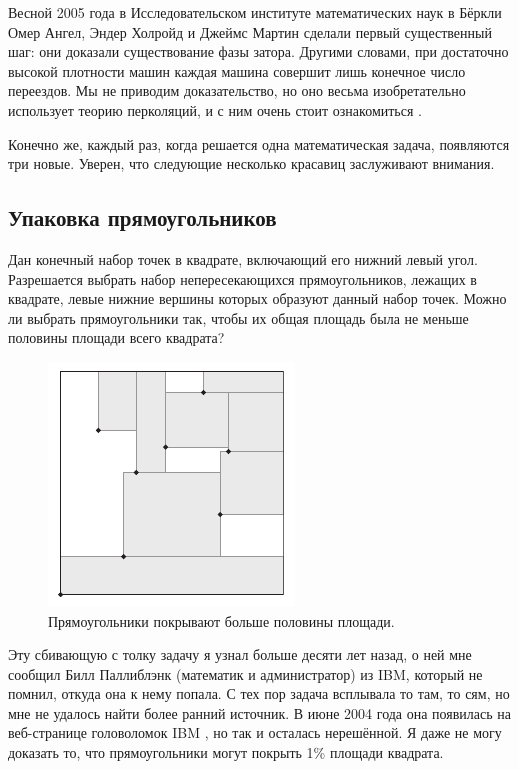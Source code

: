 Весной 2005 года в Исследовательском институте математических наук в Бёркли Омер Ангел, Эндер Холройд и Джеймс Мартин сделали первый существенный шаг: они доказали существование фазы затора.
Другими словами, при достаточно высокой плотности машин каждая машина совершит лишь конечное число переездов.
Мы не приводим доказательство, но оно весьма изобретательно использует теорию перколяций, и с ним очень стоит ознакомиться \cite{2}.

\medskip

Конечно же, каждый раз, когда решается одна математическая задача, появляются три новые.
Уверен, что следующие несколько красавиц заслуживают внимания.

\subsection*{Упаковка прямоугольников}

Дан конечный набор точек в квадрате, включающий его нижний левый угол.
Разрешается выбрать набор непересекающихся прямоугольников, лежащих в квадрате, левые нижние вершины которых образуют данный набор точек.
Можно ли выбрать прямоугольники так, чтобы их общая площадь была не меньше половины площади всего квадрата?

\begin{figure}[hbt!]
\centering
\includegraphics[scale=1]{pics/square}
\caption{Прямоугольники покрывают больше половины площади.}
\label{pic:square}
\end{figure}

\medskip

Эту сбивающую с толку задачу я узнал больше десяти лет назад,
о ней мне сообщил Билл Паллиблэнк (математик и администратор) из IBM, который не помнил, откуда она к нему попала.
С тех пор задача всплывала то там, то сям, но мне не удалось найти более ранний источник.
В июне 2004 года она появилась на веб-странице головоломок IBM \cite{ponder-this}, но так и осталась нерешённой.
Я даже не могу доказать то, что прямоугольники могут покрыть 1\% площади квадрата.

